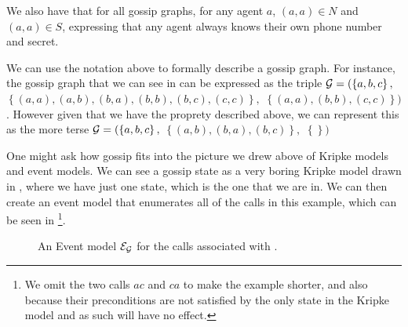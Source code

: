\documentclass[12pt, a4paper]{article}
\begin{document}
We also have that for all gossip graphs, for any agent $a$, $(a, a) \in N$ and $(a, a)
 \in S$, expressing that any agent always knows their own phone number and
 secret.

\bigskip
 
We can use the notation above to formally describe a gossip graph. For instance,
the gossip graph that we can see in  can be expressed as
the triple $\mathcal{G} = (\left\{ a, b, c \right\},$ $ \left\{ (a, a), (a, b), (b, a), (b,
  b), (b, c), (c, c) \right\},$ $ \left\{ (a, a), (b, b), (c, c) \right\})$.
However given that we have the proprety described above, we can represent this
as the more terse $\mathcal{G} = (\left\{ a, b, c \right\},$ $ \left\{ (a, b), (b,
  a), (b, c)
\right\}, $ $ \left\{ \right\})$

\bigskip


One might ask how gossip fits into the picture we drew above of Kripke models
and event models. We can see a gossip state as a very boring Kripke model drawn
in , where we have just one state, which is the one
that we are in. We can then create an event model that enumerates all of the
calls in this example, which can be seen in \footnote{We
  omit the two calls $ac$ and $ca$ to make the example shorter, and also because
their preconditions are not satisfied by the only state in the Kripke model and
as such will have no effect.}.

\begin{figure}[h]
  \centering
  \caption{An Event model $\mathcal{E_G}$ for the calls associated with .}
  \label{fig:GossipEvMo}
\end{figure}
\end{document}
